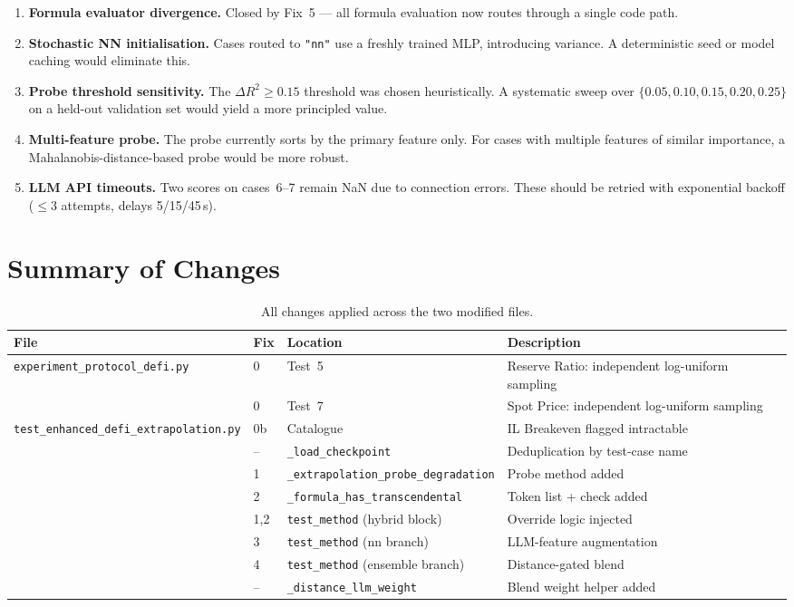 \documentclass[11pt,a4paper]{article}
\begin{document}
\begin{enumerate}[leftmargin=*]
  \item \textbf{Formula evaluator divergence.}  Closed by Fix~5 — all formula
    evaluation now routes through a single code path.
  \item \textbf{Stochastic NN initialisation.}  Cases routed to \texttt{"nn"}
    use a freshly trained MLP, introducing variance.  A deterministic seed or
    model caching would eliminate this.
  \item \textbf{Probe threshold sensitivity.}  The $\Delta R^2 \geq 0.15$
    threshold was chosen heuristically.  A systematic sweep over
    $\{0.05, 0.10, 0.15, 0.20, 0.25\}$ on a held-out validation set would
    yield a more principled value.
  \item \textbf{Multi-feature probe.}  The probe currently sorts by the
    primary feature only.  For cases with multiple features of similar
    importance, a Mahalanobis-distance-based probe would be more robust.
  \item \textbf{LLM API timeouts.}  Two scores on cases~6--7 remain NaN
    due to connection errors.  These should be retried with exponential
    backoff ($\leq 3$ attempts, delays 5/15/45\,s).
\end{enumerate}

\section{Summary of Changes}
\label{sec:changes}

\begin{table}[h]
\centering
\caption{All changes applied across the two modified files.}
\label{tab:changes}
\begin{tabular}{llll}
\toprule
\textbf{File} & \textbf{Fix} & \textbf{Location} & \textbf{Description} \\
\midrule
\texttt{experiment\_protocol\_defi.py}
  & 0  & Test~5  & Reserve Ratio: independent log-uniform sampling \\
  & 0  & Test~7  & Spot Price: independent log-uniform sampling \\
\midrule
\texttt{test\_enhanced\_defi\_extrapolation.py}
  & 0b & Catalogue     & IL Breakeven flagged intractable \\
  & -- & \texttt{\_load\_checkpoint} & Deduplication by test-case name \\
  & 1  & \texttt{\_extrapolation\_probe\_degradation} & Probe method added \\
  & 2  & \texttt{\_formula\_has\_transcendental} & Token list + check added \\
  & 1,2& \texttt{test\_method} (hybrid block) & Override logic injected \\
  & 3  & \texttt{test\_method} (nn branch)     & LLM-feature augmentation \\
  & 4  & \texttt{test\_method} (ensemble branch) & Distance-gated blend \\
  & -- & \texttt{\_distance\_llm\_weight} & Blend weight helper added \\
\bottomrule
\end{tabular}
\end{table}
\end{document}
